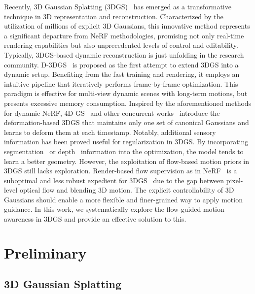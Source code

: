 \documentclass[runningheads]{llncs}
\begin{document}
Recently, 3D Gaussian Splatting (3DGS)~\cite{3dgs} has emerged as a transformative technique in 3D representation and reconstruction. Characterized by the utilization of millions of explicit 3D Gaussians, this innovative method represents a significant departure from NeRF methodologies, promising not only real-time rendering capabilities but also unprecedented levels of control and editability.
Typically, 3DGS-based dynamic reconstruction is just unfolding in the research community.
D-3DGS~\cite{d3dgs} is proposed as the first attempt to extend 3DGS into a dynamic setup. Benefiting from the fast training and rendering, it employs an intuitive pipeline that iteratively performs frame-by-frame optimization. This paradigm is effective for multi-view dynamic scenes with long-term motions, but presents excessive memory consumption.
Inspired by the aforementioned methods for dynamic NeRF, 4D-GS~\cite{4dgs} and other concurrent works~\cite{yang2023deformable,katsumata2023efficient} introduce the deformation-based 3DGS that maintains only one set of canonical Gaussians and learns to deform them at each timestamp.
Notably, additional sensory information has been proved useful for regularization in 3DGS. By incorporating segmentation~\cite{d3dgs} or depth~\cite{chung2023depth} information into the optimization, the model tends to learn a better geometry.
However, the exploitation of flow-based motion priors in 3DGS still lacks exploration.
Render-based flow supervision as in NeRF~\cite{nsff} is a suboptimal and less robust expedient for 3DGS~\cite{katsumata2023efficient} due to the gap between pixel-level optical flow and blending 3D motion.
The explicit controllability of 3D Gaussians should enable a more flexible and finer-grained way to apply motion guidance.
In this work, we systematically explore the flow-guided motion awareness in 3DGS and provide an effective solution to this.


\section{Preliminary}

\subsection{3D Gaussian Splatting}
\end{document}

